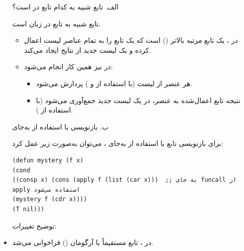 \documentclass[11pt, a4paper, oneside]{article}
\newcounter{itemadded}
\let\LaTeXStandardEnumerateBegin\enumerate
\let\LaTeXStandardEnumerateEnd\endenumerate
\renewenvironment{enumerate}{%
	\LaTeXStandardEnumerateBegin%
	\setcounter{itemadded}{0}
}{%
	\LaTeXStandardEnumerateEnd%
}%
\begin{document}
			\begin{itemize}
				
				\item[الف.] تابع  شبیه به کدام تابع در  است؟
				
					تابع  شبیه به تابع  در زبان  است.
					
					\begin{itemize}
						
						\item در ،  یک تابع مرتبه بالاتر () است که یک تابع را به تمام عناصر لیست اعمال کرده و یک لیست جدید از نتایج ایجاد می‌کند.
						
						\item در  نیز همین کار انجام می‌شود:
						
						\begin{itemize}
							
							\item هر عنصر از لیست (با استفاده از  و ) پردازش می‌شود.
							
							\item نتیجه تابع اعمال‌شده به عنصر، در یک لیست جدید جمع‌آوری می‌شود (با استفاده از ).
							
						\end{itemize}
						
					\end{itemize}
				
				\item[ب.] بازنویسی  با استفاده از  به‌جای 
				
				برای بازنویسی تابع  با استفاده از  به‌جای ، می‌توان به‌صورت زیر عمل کرد:
				
					\begin{latin}
						\begin{lstlisting}[caption={\lr{Q3 B}}]
(defun mystery (f x)
(cond
((consp x) (cons (apply f (list (car x)))  ;; به جای funcall از apply استفاده می‌شود
(mystery f (cdr x))))
(T nil)))

						\end{lstlisting}
					\end{latin}
					
					توضیح تغییرات:
					\begin{enumerate}
						
						\item در ، تابع  مستقیماً با آرگومان () فراخوانی می‌شد.
						

\end{enumerate}
\end{itemize}
\end{document}
